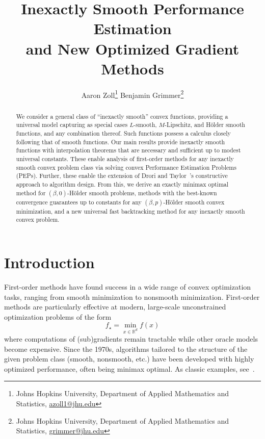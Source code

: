\documentclass[11pt, hidelinks]{article}
\numberwithin{equation}{section}
\theoremstyle{thmstyletwo}%
\numberwithin{equation}{section}
\newcommand{\R}{\mathbb{R}}
\begin{document}
    \title{Inexactly Smooth Performance Estimation\\ and New Optimized Gradient Methods}

	 \author{Aaron Zoll\footnote{Johns Hopkins University, Department of Applied Mathematics and Statistics, \url{azoll1@jhu.edu}} \qquad Benjamin Grimmer\footnote{Johns Hopkins University, Department of Applied Mathematics and Statistics, \url{grimmer@jhu.edu}}}

	\date{}
	\maketitle

	\begin{abstract}
        We consider a general class of ``inexactly smooth'' convex functions, providing a universal model capturing as special cases $L$-smooth, $M$-Lipschitz,  and H\"older smooth functions, and any combination thereof. Such functions possess a calculus closely following that of smooth functions. Our main results provide inexactly smooth functions with interpolation theorems that are necessary and sufficient up to modest universal constants. These enable analysis of first-order methods for any inexactly smooth convex problem class via solving convex Performance Estimation Problems (PEPs). Further, these enable the extension of Drori and Taylor~\cite{constructive_approach}'s constructive approach to algorithm design. From this, we derive an exactly minimax optimal method for $(\beta,0)$-H\"older smooth problems, methods with the best-known convergence guarantees up to constants for any $(\beta,p)$-H\"older smooth convex minimization, and a new universal fast backtracking method for any inexactly smooth convex problem.
	\end{abstract}


\section{Introduction}
First-order methods have found success in a wide range of convex optimization tasks, ranging from smooth minimization to nonsmooth minimization. First-order methods are particularly effective at modern, large-scale unconstrained optimization problems of the form
$$ f_\star = \min_{x\in\R^d} f(x) $$
where computations of (sub)gradients remain tractable while other oracle models become expensive. Since the 1970s, algorithms tailored to the structure of the given problem class (smooth, nonsmooth, etc.) have been developed with highly optimized performance, often being minimax optimal. As classic examples, see~\cite{nesterov2004introductory, nemirovskilowerbounds}.
\end{document}
